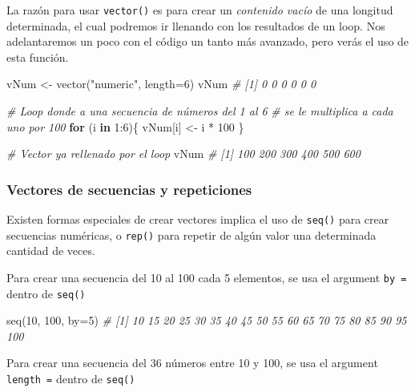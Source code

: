 \documentclass[
]{article}
\newenvironment{Shaded}{\begin{snugshade}}{\end{snugshade}}
\newcommand{\AttributeTok}[1]{\textcolor[rgb]{0.77,0.63,0.00}{#1}}
\newcommand{\CommentTok}[1]{\textcolor[rgb]{0.56,0.35,0.01}{\textit{#1}}}
\newcommand{\ControlFlowTok}[1]{\textcolor[rgb]{0.13,0.29,0.53}{\textbf{#1}}}
\newcommand{\DecValTok}[1]{\textcolor[rgb]{0.00,0.00,0.81}{#1}}
\newcommand{\FunctionTok}[1]{\textcolor[rgb]{0.00,0.00,0.00}{#1}}
\newcommand{\NormalTok}[1]{#1}
\newcommand{\OtherTok}[1]{\textcolor[rgb]{0.56,0.35,0.01}{#1}}
\newcommand{\SpecialCharTok}[1]{\textcolor[rgb]{0.00,0.00,0.00}{#1}}
\newcommand{\StringTok}[1]{\textcolor[rgb]{0.31,0.60,0.02}{#1}}
\theoremstyle{definition}
\theoremstyle{definition}
\theoremstyle{definition}
\theoremstyle{definition}
\theoremstyle{remark}
\begin{document}
La razón para usar \texttt{vector()} es para crear un \emph{contenido vacío} de una longitud determinada, el cual podremos ir llenando con los resultados de un loop. Nos adelantaremos un poco con el código un tanto más avanzado, pero verás el uso de esta función.

\begin{Shaded}
\begin{Highlighting}[]
\NormalTok{vNum }\OtherTok{\textless{}{-}} \FunctionTok{vector}\NormalTok{(}\StringTok{"numeric"}\NormalTok{, }\AttributeTok{length=}\DecValTok{6}\NormalTok{)}
\NormalTok{vNum}
\CommentTok{\# [1] 0 0 0 0 0 0}

\CommentTok{\# Loop donde a una secuencia de números del 1 al 6}
\CommentTok{\# se le multiplica a cada uno por 100}
\ControlFlowTok{for}\NormalTok{ (i }\ControlFlowTok{in} \DecValTok{1}\SpecialCharTok{:}\DecValTok{6}\NormalTok{)\{}
\NormalTok{  vNum[i] }\OtherTok{\textless{}{-}}\NormalTok{ i }\SpecialCharTok{*} \DecValTok{100}
\NormalTok{\}}

\CommentTok{\# Vector ya rellenado por el loop}
\NormalTok{vNum}
\CommentTok{\# [1] 100 200 300 400 500 600}
\end{Highlighting}
\end{Shaded}

\hypertarget{vectores-de-secuencias-y-repeticiones}{%
\subsubsection{Vectores de secuencias y repeticiones}\label{vectores-de-secuencias-y-repeticiones}}

Existen formas especiales de crear vectores implica el uso de \texttt{seq()} para crear secuencias numéricas, o \texttt{rep()} para repetir de algún valor una determinada cantidad de veces.

Para crear una secuencia del 10 al 100 cada 5 elementos, se usa el argument \texttt{by\ =} dentro de \texttt{seq()}

\begin{Shaded}
\begin{Highlighting}[]
\FunctionTok{seq}\NormalTok{(}\DecValTok{10}\NormalTok{, }\DecValTok{100}\NormalTok{, }\AttributeTok{by=}\DecValTok{5}\NormalTok{)}
\CommentTok{\#  [1]  10  15  20  25  30  35  40  45  50  55  60  65  70  75  80  85  90  95 100}
\end{Highlighting}
\end{Shaded}

Para crear una secuencia del 36 números entre 10 y 100, se usa el argument \texttt{length\ =} dentro de \texttt{seq()}
\end{document}
